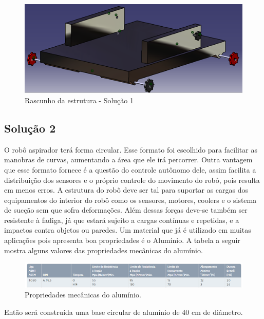 		\begin{figure}[H]
			\centering
			\includegraphics[scale=0.8]{figuras/rascunho_estrutura.png}
			\caption{Rascunho da estrutura - Solução 1}
			\label{img:rascunho1}
		\end{figure}


		\subsection{Solução 2} %
		\label{sub:solução_2}
			
			O robô aspirador terá forma circular. Esse formato foi escolhido para facilitar as manobras de curvas, aumentando a área que ele irá percorrer. Outra vantagem que esse formato fornece é a questão do controle autônomo dele, assim facilita a distribuição dos sensores e o próprio controle do movimento do robô, pois resulta em menos erros. A estrutura do robô deve ser tal para suportar as cargas dos equipamentos do interior do robô como os sensores, motores, coolers e o sistema de sucção sem que sofra deformações. Além dessas forças deve-se também ser resistente à fadiga, já que estará sujeito a cargas contínuas e repetidas, e a impactos contra objetos ou paredes. Um material que já é utilizado em muitas aplicações pois apresenta boa propriedades é o Alumínio. A tabela a seguir mostra alguns valores das propriedades mecânicas do alumínio.

			\begin{figure}[H]
				\centering
				\includegraphics[scale=0.8]{figuras/tabela_estru1.png}
				\caption{Propriedades mecânicas do alumínio.}
				\label{img:rascunho1}
			\end{figure}

			Então será construída uma base circular de alumínio de 40 cm de diâmetro.

